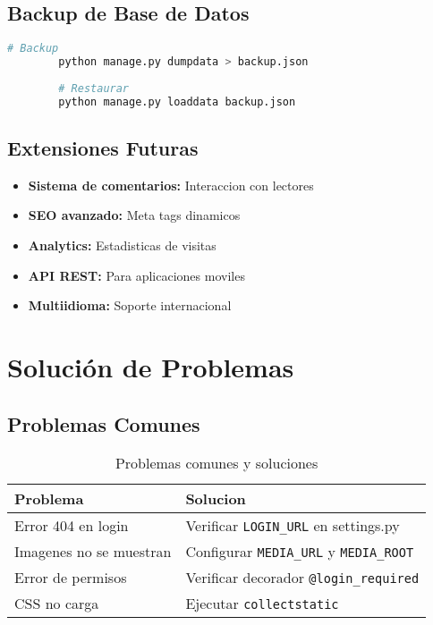 \documentclass[11pt,a4paper]{report}
\begin{document}
	\subsection{Backup de Base de Datos}
	
	\begin{lstlisting}[language=bash]
		# Backup
		python manage.py dumpdata > backup.json
		
		# Restaurar
		python manage.py loaddata backup.json
	\end{lstlisting}
	
	\subsection{Extensiones Futuras}
	\begin{itemize}
		\item \textbf{Sistema de comentarios:} Interaccion con lectores
		\item \textbf{SEO avanzado:} Meta tags dinamicos
		\item \textbf{Analytics:} Estadisticas de visitas
		\item \textbf{API REST:} Para aplicaciones moviles
		\item \textbf{Multiidioma:} Soporte internacional
	\end{itemize}
	
	\section{Solución de Problemas}
	
	\subsection{Problemas Comunes}
	
	\begin{table}[h!]
		\centering
		\begin{tabular}{@{}p{6cm}p{8cm}@{}}
			\toprule
			\textbf{Problema} & \textbf{Solucion} \\
			\midrule
			Error 404 en login & Verificar \texttt{LOGIN\_URL} en settings.py \\
			Imagenes no se muestran & Configurar \texttt{MEDIA\_URL} y \texttt{MEDIA\_ROOT} \\
			Error de permisos & Verificar decorador \texttt{@login\_required} \\
			CSS no carga & Ejecutar \texttt{collectstatic} \\
			\bottomrule
		\end{tabular}
		\caption{Problemas comunes y soluciones}
		\label{tab:troubleshooting}
	\end{table}
	
\end{document}

